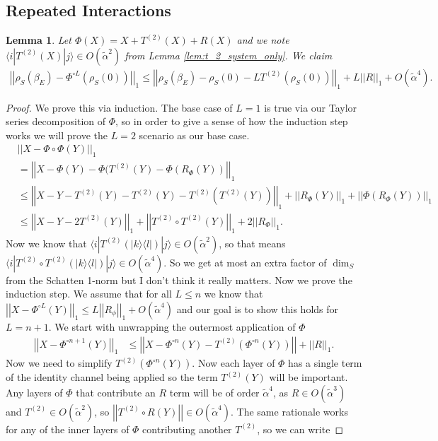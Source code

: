 \documentclass{article}
\newtheorem{lemma}[theorem]{Lemma}
\newcommand{\ket}[1]{|#1\rangle}
\newcommand{\bra}[1]{\langle #1|}
\newcommand{\ketbra}[2]{| #1\rangle\! \langle #2|}
\newcommand{\norm}[1]{\left| \left| #1 \right| \right|}
\newcommand{\bigo}[1]{O\left( #1 \right)}
\begin{document}
\subsection{Repeated Interactions}
\begin{lemma} \label{lem:repeated_interactions_l}
    Let $\Phi(X) = X + T^{(2)}(X) + R(X)$ and we note $\bra{i} T^{(2)}(X)\ket{j} \in \bigo{\widetilde{\alpha}^2}$ from Lemma \ref{lem:t_2_system_only}. We claim
    \begin{align}
        \norm{\rho_S(\beta_E) - \Phi^{\circ L}(\rho_S(0))}_1 \leq \norm{\rho_S(\beta_E) - \rho_S(0) - L T^{(2)}(\rho_S(0))}_1 + L \norm{R}_1 + \bigo{\widetilde{\alpha}^4}.
    \end{align}
\end{lemma}
\begin{proof}
 We prove this via induction. The base case of $L=1$ is true via our Taylor series decomposition of $\Phi$, so in order to give a sense of how the induction step works we will prove the $L=2$ scenario as our base case.    
 \begin{align}
    &\norm{X - \Phi \circ \Phi (Y)}_1\\
    & = \norm{X - \Phi(Y) - \Phi(T^{(2)}(Y) - \Phi(R_{\Phi}(Y))}_1 \\
    &\leq \norm{X - Y - T^{(2)}(Y) - T^{(2)}(Y) - T^{(2)}(T^{(2)}(Y))}_1 + \norm{R_{\Phi}(Y)}_1 + \norm{\Phi(R_{\Phi}(Y))}_1 \\
    &\leq \norm{X - Y - 2 T^{(2)}(Y)}_1 + \norm{T^{(2)} \circ T^{(2)}(Y)}_1 + 2 \norm{R_{\Phi}}_1.
\end{align}
Now we know that $\bra{i}T^{(2)}(\ketbra{k}{l})\ket{j} \in \bigo{\widetilde{\alpha}^2}$, so that means $\bra{i}T^{(2)}\circ T^{(2)}(\ketbra{k}{l})\ket{j} \in \bigo{\widetilde{\alpha}^4}$. So we get at most an extra factor of $\dim_S$ from the Schatten 1-norm but I don't think it really matters.  
Now we prove the induction step. We assume that for all $L \le n$ we know that $\norm{X - \Phi^{\circ L}(Y)}_1 \le L \norm{R_{\phi}}_1 + \bigo{\widetilde{\alpha}^4}$ and our goal is to show this holds for $L = n + 1$. We start with unwrapping the outermost application of $\Phi$
\begin{align}
    \norm{X - \Phi^{\circ n + 1}(Y)}_1 &\le \norm{X - \Phi^{\circ n}(Y) - T^{(2)}(\Phi^{\circ n}(Y))} + \norm{R}_1.
\end{align}
Now we need to simplify $T^{(2)}(\Phi^{\circ n}(Y))$. Now each layer of $\Phi$ has a single term of the identity channel being applied so the term $T^{(2)}(Y)$ will be important. Any layers of $\Phi$ that contribute an $R$ term will be of order $\widetilde{\alpha}^4$, as $R \in \bigo{\widetilde{\alpha}^3}$ and $T^{(2)} \in \bigo{\widetilde{\alpha}^2}$, so $\norm{T^{(2)} \circ R(Y)} \in \bigo{\widetilde{\alpha}^4}$. The same rationale works for any of the inner layers of $\Phi$ contributing another $T^{(2)}$, so we can write

\end{proof}
\end{document}
